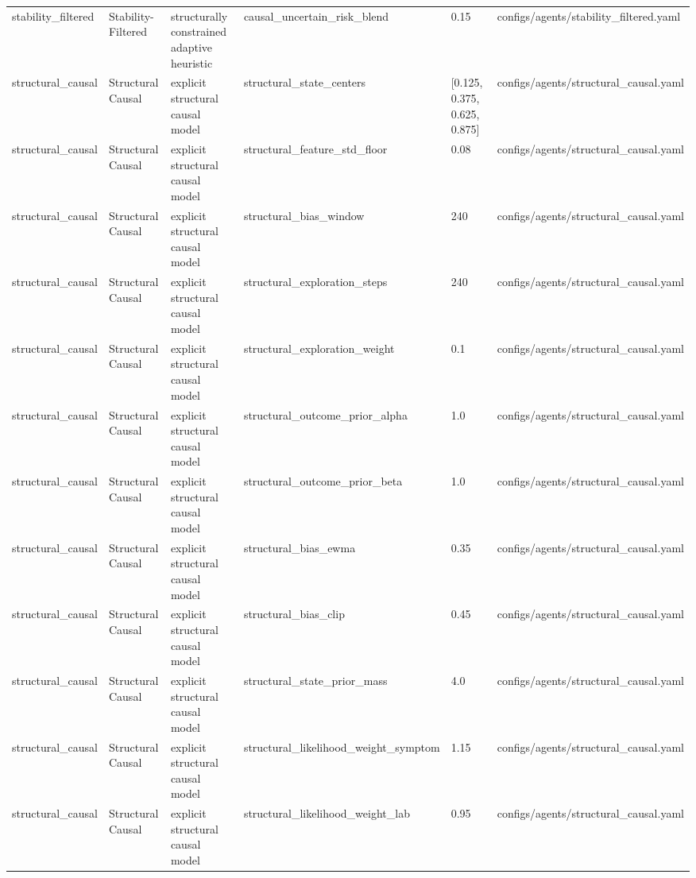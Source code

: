 \begin{tabular}{llllll}
stability\_filtered & Stability-Filtered & structurally constrained adaptive heuristic & causal\_uncertain\_risk\_blend & 0.15 & configs/agents/stability\_filtered.yaml \\
structural\_causal & Structural Causal & explicit structural causal model & structural\_state\_centers & [0.125, 0.375, 0.625, 0.875] & configs/agents/structural\_causal.yaml \\
structural\_causal & Structural Causal & explicit structural causal model & structural\_feature\_std\_floor & 0.08 & configs/agents/structural\_causal.yaml \\
structural\_causal & Structural Causal & explicit structural causal model & structural\_bias\_window & 240 & configs/agents/structural\_causal.yaml \\
structural\_causal & Structural Causal & explicit structural causal model & structural\_exploration\_steps & 240 & configs/agents/structural\_causal.yaml \\
structural\_causal & Structural Causal & explicit structural causal model & structural\_exploration\_weight & 0.1 & configs/agents/structural\_causal.yaml \\
structural\_causal & Structural Causal & explicit structural causal model & structural\_outcome\_prior\_alpha & 1.0 & configs/agents/structural\_causal.yaml \\
structural\_causal & Structural Causal & explicit structural causal model & structural\_outcome\_prior\_beta & 1.0 & configs/agents/structural\_causal.yaml \\
structural\_causal & Structural Causal & explicit structural causal model & structural\_bias\_ewma & 0.35 & configs/agents/structural\_causal.yaml \\
structural\_causal & Structural Causal & explicit structural causal model & structural\_bias\_clip & 0.45 & configs/agents/structural\_causal.yaml \\
structural\_causal & Structural Causal & explicit structural causal model & structural\_state\_prior\_mass & 4.0 & configs/agents/structural\_causal.yaml \\
structural\_causal & Structural Causal & explicit structural causal model & structural\_likelihood\_weight\_symptom & 1.15 & configs/agents/structural\_causal.yaml \\
structural\_causal & Structural Causal & explicit structural causal model & structural\_likelihood\_weight\_lab & 0.95 & configs/agents/structural\_causal.yaml \\

\end{tabular}
